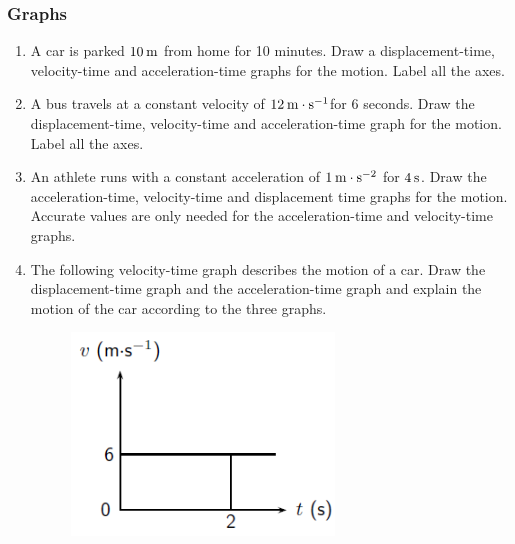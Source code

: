             \subsubsection{  Graphs }
            \nopagebreak
          \label{m38795*id72955}\begin{enumerate}[noitemsep, label=\textbf{\arabic*}. ] 
            \label{m38795*uid116}\item A car is parked $10\phantom{\rule{2pt}{0ex}}\mathrm{m}$ from home for 10 minutes. Draw a displacement-time, velocity-time and acceleration-time graphs for the motion. Label all the axes.\newline
\label{m38795*uid117}\item A bus travels at a constant velocity of $12\phantom{\rule{2pt}{0ex}}\mathrm{m}\ensuremath{\cdot}\mathrm{s}{}^{-1}$for 6 seconds. Draw the displacement-time, velocity-time and acceleration-time graph for the motion. Label all the axes.\newline
\label{m38795*uid118}\item An athlete runs with a constant acceleration of $1\phantom{\rule{2pt}{0ex}}\mathrm{m}\ensuremath{\cdot}\mathrm{s}{}^{-2}$ for $4\phantom{\rule{2pt}{0ex}}\mathrm{s}$. Draw the acceleration-time, velocity-time and displacement time graphs for the motion. Accurate values are only needed for the acceleration-time and velocity-time graphs.\newline
\label{m38795*uid119}\item The following velocity-time graph describes the motion of a car. Draw the displacement-time graph and the acceleration-time graph and explain the motion of the car according to the three graphs.
    \setcounter{subfigure}{0}
	\begin{figure}[H] %
    \begin{center}
    \label{m38795*id73065!!!underscore!!!media}\label{m38795*id73065!!!underscore!!!printimage}\includegraphics[width=7cm]{col11305.imgs/m38795_PG10C2_027.png} %

\end{center}
\end{figure}
\end{enumerate}
